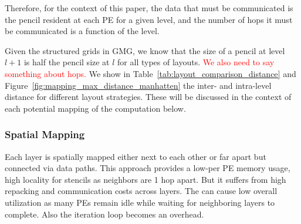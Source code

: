 \documentclass[sigconf]{acmart}
\begin{document}
Therefore, for the context of this paper, the data that must be communicated is the pencil resident at each PE for a given level, and the number of hops it must be communicated is a function of the level.  

    Given the structured grids in GMG, we know that the size of a pencil at level $l+1$ is half the pencil size at $l$
    for all types of layouts. \textcolor{red}{We also need to say something about hops.}  %
    We show in 
    Table~\ref{tab:layout_comparison_distance} and Figure~\ref{fig:mapping_max_distance_manhatten} the inter- and intra-level distance for different layout strategies.  These will be discussed in the context of each potential mapping of the computation below.
    
\subsubsection{Spatial Mapping}
       Each layer is spatially mapped either next to each other or far apart but connected via data paths. This approach provides a low-per PE memory usage, high locality for stencils as neighbors are 1 hop apart. But it suffers from high repacking and communication costs across layers. The can cause low overall utilization as many PEs remain idle while waiting for neighboring layers to complete. Also the iteration loop becomes an overhead.
\end{document}
